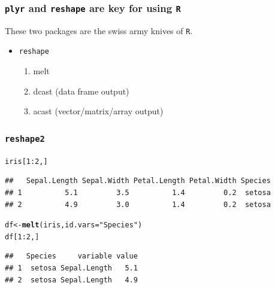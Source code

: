 \documentclass{beamer}\usepackage[]{graphicx}\usepackage[]{color}
\makeatletter
\newcommand{\hlnum}[1]{\textcolor[rgb]{0.686,0.059,0.569}{#1}}%
\newcommand{\hlstr}[1]{\textcolor[rgb]{0.192,0.494,0.8}{#1}}%
\newcommand{\hlopt}[1]{\textcolor[rgb]{0,0,0}{#1}}%
\newcommand{\hlstd}[1]{\textcolor[rgb]{0.345,0.345,0.345}{#1}}%
\newcommand{\hlkwb}[1]{\textcolor[rgb]{0.69,0.353,0.396}{#1}}%
\newcommand{\hlkwc}[1]{\textcolor[rgb]{0.333,0.667,0.333}{#1}}%
\newcommand{\hlkwd}[1]{\textcolor[rgb]{0.737,0.353,0.396}{\textbf{#1}}}%
\newenvironment{kframe}{%
 \def\at@end@of@kframe{}%
 \ifinner\ifhmode%
  \def\at@end@of@kframe{\end{minipage}}%
  \begin{minipage}{\columnwidth}%
 \fi\fi%
 \def\FrameCommand##1{\hskip\@totalleftmargin \hskip-\fboxsep
 \colorbox{shadecolor}{##1}\hskip-\fboxsep
     \hskip-\linewidth \hskip-\@totalleftmargin \hskip\columnwidth}%
 \MakeFramed {\advance\hsize-\width
   \@totalleftmargin\z@ \linewidth\hsize
   \@setminipage}}%
 {\par\unskip\endMakeFramed%
 \at@end@of@kframe}
\newenvironment{knitrout}{}{} %
\makeatother
\begin{document}


\begin{frame}[fragile]
\frametitle{\texttt{plyr} and \texttt{reshape} are key for using \texttt{R}}
These two packages are the swiss army knives of \texttt{R}.
\begin{itemize}
    \item \texttt{reshape}
    \begin{enumerate}
    \item melt
    \item dcast (data frame output)
    \item acast (vector/matrix/array output)
    \end{enumerate}
\end{itemize}
\end{frame}


\begin{frame}[fragile]
\frametitle{\texttt{reshape2}}
\begin{knitrout}\footnotesize
{}\color{fgcolor}\begin{kframe}
\begin{alltt}
\hlstd{iris[}\hlnum{1}\hlopt{:}\hlnum{2}\hlstd{, ]}
\end{alltt}
\begin{verbatim}
##   Sepal.Length Sepal.Width Petal.Length Petal.Width Species
## 1          5.1         3.5          1.4         0.2  setosa
## 2          4.9         3.0          1.4         0.2  setosa
\end{verbatim}
\begin{alltt}
\hlstd{df}  \hlkwb{<-} \hlkwd{melt}\hlstd{(iris,} \hlkwc{id.vars} \hlstd{=} \hlstr{"Species"}\hlstd{)}
\hlstd{df[}\hlnum{1}\hlopt{:}\hlnum{2}\hlstd{, ]}
\end{alltt}
\begin{verbatim}
##   Species     variable value
## 1  setosa Sepal.Length   5.1
## 2  setosa Sepal.Length   4.9
\end{verbatim}
\end{kframe}
\end{knitrout}
\end{frame}

\end{document}
